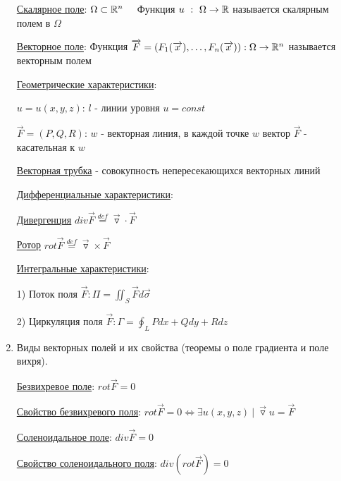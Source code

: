 \documentclass[12pt]{article}
\begin{document}
\begin{enumerate}
        \hyperlink{scalarfield}{Скалярное поле}: $\Omega \subset \mathbb{R}^n \quad$ Функция $u \ : \ \Omega \to \mathbb{R}$ называется скалярным полем в $\Omega$

        \hyperlink{vectorfield}{Векторное поле}: Функция $\overrightarrow{F} = (F_1(\overrightarrow{x}), \dots, F_n(\overrightarrow{x})) : \Omega \to \mathbb{R}^n$ называется векторным полем

        \hyperlink{scalarandvectorfieldgeometric}{Геометрические характеристики}:

        $u = u(x, y, z)$: $l$ - линии уровня $u = const$

        $\overrightarrow{F} = (P, Q, R)$: $w$ - векторная линия, в каждой точке $w$ вектор $\overrightarrow{F}$ - касательная к $w$

        \underline{Векторная трубка} - совокупность непересекающихся векторных линий

        \hyperlink{differentialcharacteristics}{Дифференциальные характеристики}:

        \hyperlink{divergence}{Дивергенция} $div \overrightarrow{F} \stackrel{def}{=} \overrightarrow{\triangledown} \cdot \overrightarrow{F}$

        \hyperlink{rotor}{Ротор} $rot \overrightarrow{F} \stackrel{def}{=} \overrightarrow{\triangledown} \times \overrightarrow{F}$

        \hyperlink{integralcharacteristics}{Интегральные характеристики}:

        1) Поток поля $\overrightarrow{F}: \Pi = \iint_S \overrightarrow{F}d\overrightarrow{\sigma}$

        2) Циркуляция поля $\overrightarrow{F}: \Gamma = \oint_L Pdx + Qdy + Rdz$

        \item Виды векторных полей и их свойства (теоремы о поле градиента и поле вихря).

        \hyperlink{vectorfieldtypes}{Безвихревое поле}: $rot \overrightarrow{F} = 0$

        \hyperlink{irrotationalfieldproperty}{Свойство безвихревого поля}: $rot \overrightarrow{F} = 0 \Longleftrightarrow \exists u(x, y, z) \ | \ \overrightarrow{\triangledown}u = \overrightarrow{F}$

        \hyperlink{vectorfieldtypes}{Соленоидальное поле}: $div \overrightarrow{F} = 0$

        \hyperlink{solenoidalfieldproperty}{Свойство соленоидального поля}: $div (rot \overrightarrow{F}) = 0$


\end{enumerate}
\end{document}
